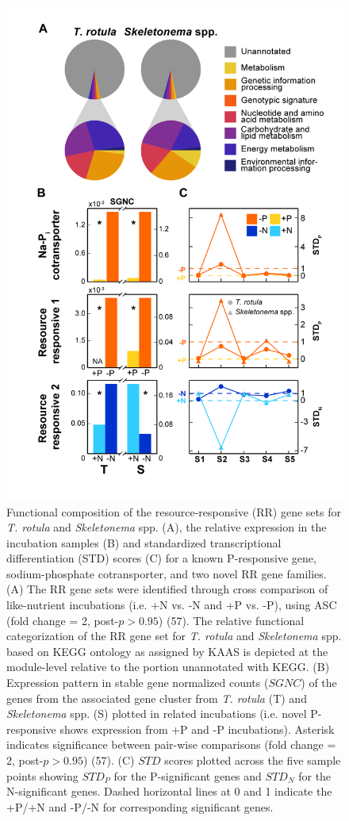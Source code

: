 

\begin{figure}[p!]
  \centering
    \includegraphics[width=.65\textwidth]{Images/C3_Figure4_BarLinePlots.png}
    \caption[Functional composition of resource-responsive gene set]{Functional composition of the resource-responsive (RR) gene sets for \textit{T. rotula} and \textit{Skeletonema} spp. (A), the relative expression in the incubation samples (B) and standardized transcriptional differentiation (STD) scores (C) for a known P-responsive gene, sodium-phosphate cotransporter, and two novel RR gene families. (A) The RR gene sets were identified through cross comparison of like-nutrient incubations (i.e. +N vs. -N and +P vs. -P), using ASC (fold change = 2, post-$p > 0.95$) (57). The relative functional categorization of the RR gene set for \textit{T. rotula} and \textit{Skeletonema} spp. based on KEGG ontology as assigned by KAAS is depicted at the module-level relative to the portion unannotated with KEGG. (B) Expression pattern in stable gene normalized counts ($SGNC$) of the genes from the associated gene cluster from \textit{T. rotula} (T) and \textit{Skeletonema} spp. (S) plotted in related incubations (i.e. novel P-responsive shows expression from +P and -P incubations). Asterisk indicates significance between pair-wise comparisons (fold change = 2, post-$p > 0.95$) (57). (C) $STD$ scores plotted across the five sample points showing $STD_P$ for the P-significant genes and $STD_N$ for the N-significant genes. Dashed horizontal lines at 0 and 1 indicate the +P/+N and -P/-N for corresponding significant genes.} 
  \label{fig:c3f4}
\end{figure}

